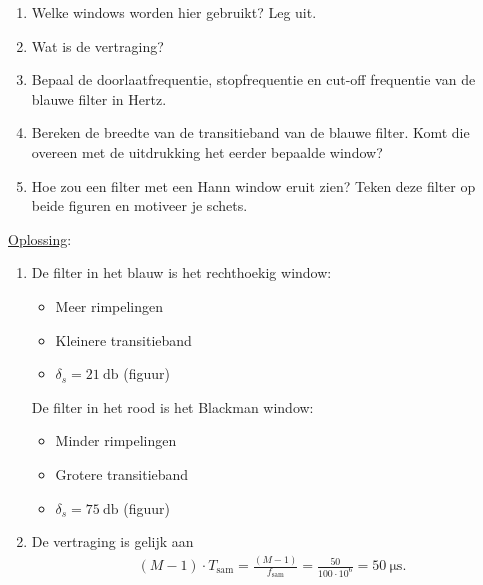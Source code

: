\documentclass[kulak]{kulakarticle}
\begin{document}
	\begin{enumerate}
		\item Welke windows worden hier gebruikt? Leg uit.
		\item Wat is de vertraging?
		\item Bepaal de doorlaatfrequentie, stopfrequentie en cut-off frequentie van de blauwe filter in Hertz.
		\item Bereken de breedte van de transitieband van de blauwe filter. Komt die overeen met de uitdrukking het eerder bepaalde window?
		\item Hoe zou een filter met een Hann window eruit zien? Teken deze filter op beide figuren en motiveer je schets.
	\end{enumerate}

	\underline{Oplossing}:

	\begin{enumerate}
		\item De filter in het blauw is het rechthoekig window: \begin{itemize}
			\item Meer rimpelingen
			\item Kleinere transitieband
			\item \(\delta_s = \SI{21}{\decibel}\) (figuur)
		\end{itemize}

		De filter in het rood is het Blackman window: \begin{itemize}
			\item Minder rimpelingen
			\item Grotere transitieband
			\item \(\delta_s = \SI{75}{\decibel}\) (figuur)
		\end{itemize}

		\item De vertraging is gelijk aan \begin{align*}
			(M-1) \cdot T_\text{sam} = \frac{(M-1)}{f_\text{sam}} = \frac{50}{100 \cdot 10^{6}} = \SI{50}{\micro\second}.
		\end{align*}


\end{enumerate}
\end{document}
